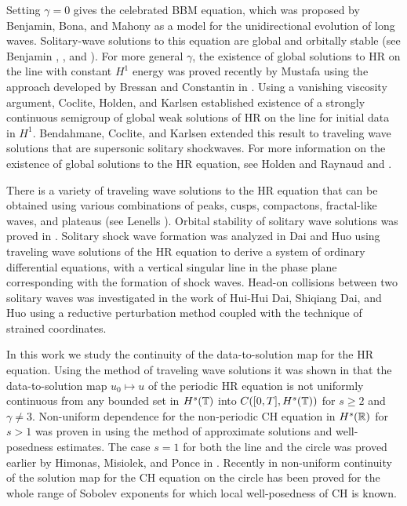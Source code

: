 Setting $\gamma = 0$ gives the celebrated 
BBM equation, which was proposed by 
Benjamin, Bona, and Mahony 
\cite{Benjamin_1972_Model-equations} as a model for 
the unidirectional evolution of long waves.
Solitary-wave solutions to this 
equation are global and orbitally stable (see Benjamin 
\cite{Benjamin_1972_The-stability-o}, 
\cite{Benjamin_1972_Model-equations}, and 
\cite{Constantin_2000_Stability-of-a-}).
For more general $\gamma$, the existence of global 
solutions to HR on the line with constant $H^1$ energy
was proved recently by Mustafa \cite{Mustafa_2007_Global-conserva}
using the approach developed by Bressan and 
Constantin in \cite{Bressan_2007_Global-conserva}. Using a vanishing 
viscosity argument, Coclite, 
Holden, and Karlsen \cite{Coclite_2005_Global-weak-sol}
established existence of a strongly continuous semigroup of global 
weak solutions of HR on the line for initial data in $H^1$.
Bendahmane, Coclite, and Karlsen 
\cite{Bendahmane_2006_Hsp-1-perturbat} extended this result to traveling 
wave solutions that are supersonic solitary shockwaves.
For more information on the existence of global solutions to the HR
equation, see Holden and Raynaud \cite{Holden_2007_Global-conserva}
and \cite{Yin_2003_On-the-Cauchy-p}. 

There is a variety of traveling wave solutions to the HR equation that can be 
obtained using various combinations of peaks, cusps, compactons, 
fractal-like waves, and plateaus (see Lenells 
\cite{Lenells_2006_Traveling-waves}). Orbital stability of solitary wave 
solutions was proved in \cite{Constantin_2000_Stability-of-a-}.
Solitary shock wave formation was 
analyzed in Dai and Huo \cite{Dai_2000_Solitary-shock-} using traveling 
wave solutions of the HR equation to derive a system of ordinary differential 
equations, with a vertical singular line in the phase plane corresponding with the 
formation of shock waves. Head-on collisions between two solitary 
waves was investigated in the work of Hui-Hui Dai, 
Shiqiang Dai, and Huo \cite{Dai_2000_Head-on-collisi} using a reductive 
perturbation method coupled with the technique of strained coordinates. 

In this work we study the continuity of the data-to-solution map for the HR 
equation.
Using the method of traveling wave solutions it was shown in  
\cite{Olson_2006_Non-uniform-dep} that the data-to-solution map
$u_0  \mapsto u$ of the periodic HR equation is not uniformly continuous 
from any bounded set in $H^s(\mathbb{T})$ into $C([0, T ], H^s(\mathbb{T}))$ for $s \ge 
2$ and $\gamma \neq 3$. Non-uniform dependence for the non-periodic CH 
equation in 
$H^s(\mathbb{R})$ for $s>1$ was proven in \cite{Himonas:2009fk} 
using the method of approximate solutions and well-posedness estimates. The 
case $s=1$ for both the line and the circle
was proved earlier by Himonas, Misiolek, and Ponce in 
\cite{Himonas_2007_Non-uniform-con}.
Recently  in \cite{Himonas_2009_Non-uniform-dep-per} non-uniform 
continuity of the solution map for the CH equation
on the circle has been proved
for the whole range of Sobolev exponents for which local well-posedness of 
CH is known.

